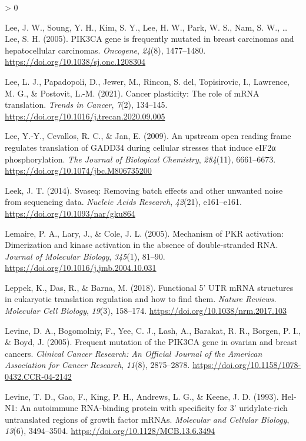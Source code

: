 \documentclass[
  12pt,
  openany]{book}
\newlength{\cslhangindent}
\newenvironment{CSLReferences}[2] %
 {%
  \setlength{\parindent}{0pt}
  \ifodd #1 \everypar{\setlength{\hangindent}{\cslhangindent}}\ignorespaces\fi
  \ifnum #2 > 0
  \setlength{\parskip}{#2\baselineskip}
  \fi
 }%
 {}
\begin{document}
\begin{CSLReferences}{1}{0}
\leavevmode\hypertarget{ref-Lee2005}{}%
Lee, J. W., Soung, Y. H., Kim, S. Y., Lee, H. W., Park, W. S., Nam, S. W., \ldots{} Lee, S. H. (2005). {PIK}3CA gene is frequently mutated in breast carcinomas and hepatocellular carcinomas. \emph{Oncogene}, \emph{24}(8), 1477--1480. \url{https://doi.org/10.1038/sj.onc.1208304}

\leavevmode\hypertarget{ref-Lee2021}{}%
Lee, L. J., Papadopoli, D., Jewer, M., Rincon, S. del, Topisirovic, I., Lawrence, M. G., \& Postovit, L.-M. (2021). Cancer plasticity: The role of {mRNA} translation. \emph{Trends in Cancer}, \emph{7}(2), 134--145. \url{https://doi.org/10.1016/j.trecan.2020.09.005}

\leavevmode\hypertarget{ref-Lee2009}{}%
Lee, Y.-Y., Cevallos, R. C., \& Jan, E. (2009). An upstream open reading frame regulates translation of {GADD}34 during cellular stresses that induce {eIF}2α phosphorylation. \emph{The Journal of Biological Chemistry}, \emph{284}(11), 6661--6673. \url{https://doi.org/10.1074/jbc.M806735200}

\leavevmode\hypertarget{ref-Leek2014}{}%
Leek, J. T. (2014). Svaseq: Removing batch effects and other unwanted noise from sequencing data. \emph{Nucleic Acids Research}, \emph{42}(21), e161--e161. \url{https://doi.org/10.1093/nar/gku864}

\leavevmode\hypertarget{ref-Lemaire2005}{}%
Lemaire, P. A., Lary, J., \& Cole, J. L. (2005). Mechanism of {PKR} activation: Dimerization and kinase activation in the absence of double-stranded {RNA}. \emph{Journal of Molecular Biology}, \emph{345}(1), 81--90. \url{https://doi.org/10.1016/j.jmb.2004.10.031}

\leavevmode\hypertarget{ref-Leppek2018}{}%
Leppek, K., Das, R., \& Barna, M. (2018). Functional 5' {UTR} {mRNA} structures in eukaryotic translation regulation and how to find them. \emph{Nature Reviews. Molecular Cell Biology}, \emph{19}(3), 158--174. \url{https://doi.org/10.1038/nrm.2017.103}

\leavevmode\hypertarget{ref-Levine2005}{}%
Levine, D. A., Bogomolniy, F., Yee, C. J., Lash, A., Barakat, R. R., Borgen, P. I., \& Boyd, J. (2005). Frequent mutation of the {PIK}3CA gene in ovarian and breast cancers. \emph{Clinical Cancer Research: An Official Journal of the American Association for Cancer Research}, \emph{11}(8), 2875--2878. \url{https://doi.org/10.1158/1078-0432.CCR-04-2142}

\leavevmode\hypertarget{ref-Levine1993}{}%
Levine, T. D., Gao, F., King, P. H., Andrews, L. G., \& Keene, J. D. (1993). Hel-N1: An autoimmune {RNA}-binding protein with specificity for 3' uridylate-rich untranslated regions of growth factor {mRNAs}. \emph{Molecular and Cellular Biology}, \emph{13}(6), 3494--3504. \url{https://doi.org/10.1128/MCB.13.6.3494}


\end{CSLReferences}
\end{document}

